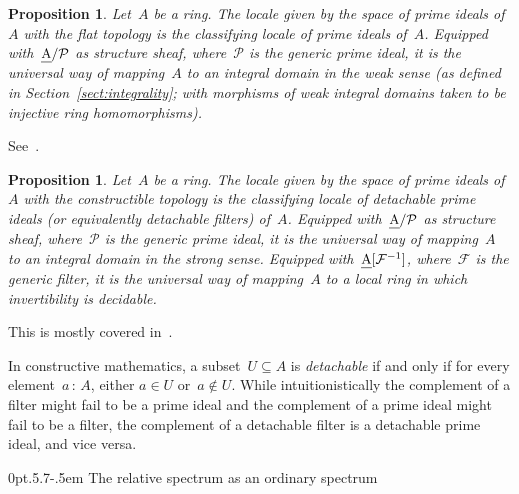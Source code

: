 \documentclass[10pt,reqno,a4paper]{amsbook}
\makeatletter
\theoremstyle{definition}
\theoremstyle{plain}
\newtheorem{prop}[defn]{Proposition}
\theoremstyle{remark}
\newcommand{\F}{\mathcal{F}}
\renewcommand{\P}{\mathcal{P}}
\let\oldul\ul
\renewcommand{\ul}[1]{\text{\oldul{$#1$}}}
\newcommand{\?}{\,{:}\,}
\renewcommand{\_}{\mathpunct{.}\,}
\renewenvironment{proof}[1][\proofname]{\par
  \pushQED{\qed}%
  \normalfont \topsep6\p@\@plus6\p@\relax
  \trivlist
  \item[\hskip\labelsep
        \itshape
    #1\@addpunct{.}]\ignorespaces
}{%
  \popQED\endtrivlist\@endpefalse
}
\def\subsection{\@startsection{subsection}{2}%
  {0pt}{.5\linespacing\@plus.7\linespacing}{-.5em}%
  {\normalfont\bfseries}}
\makeatother
\begin{document}
\begin{prop}Let~$A$ be a ring. The locale given by the space of prime ideals
of~$A$ with the flat topology is the classifying locale of prime ideals of~$A$.
Equipped with~$\ul{A}/\P$ as structure sheaf, where~$\P$ is the generic prime
ideal, it is the universal way of mapping~$A$ to an integral domain in the weak
sense (as defined in Section~\ref{sect:integrality}; with morphisms of
weak integral domains taken to be injective ring homomorphisms).
\end{prop}

\begin{proof}See~\cite[Proposition~4.5]{johnstone:rings-fields-and-spectra}.\end{proof}

\begin{prop}Let~$A$ be a ring. The locale given by the space of prime ideals
of~$A$ with the constructible topology is the classifying locale of detachable
prime ideals (or equivalently detachable filters) of~$A$. Equipped
with~$\ul{A}/\P$ as structure sheaf, where~$\P$ is the generic prime ideal, it
is the universal way of mapping~$A$ to an integral domain in the strong sense.
Equipped with~$\ul{A}[\F^{-1}]$, where~$\F$ is the generic filter, it is the
universal way of mapping~$A$ to a local ring in which invertibility is
decidable.\end{prop}

\begin{proof}This is mostly covered
in~\cite[p.~253]{johnstone:rings-fields-and-spectra}.\end{proof}

In constructive mathematics, a subset~$U \subseteq A$ is \emph{detachable} if
and only if for every element~$a\?A$, either $a \in U$ or~$a \not\in U$. While
intuitionistically the complement of a filter might fail to be a prime ideal
and the complement of a prime ideal might fail to be a filter, the complement
of a detachable filter is a detachable prime ideal, and vice versa.


\subsection{The relative spectrum as an ordinary spectrum}\label{sect:rel-spec-as-ordinary-spec}
\end{document}
